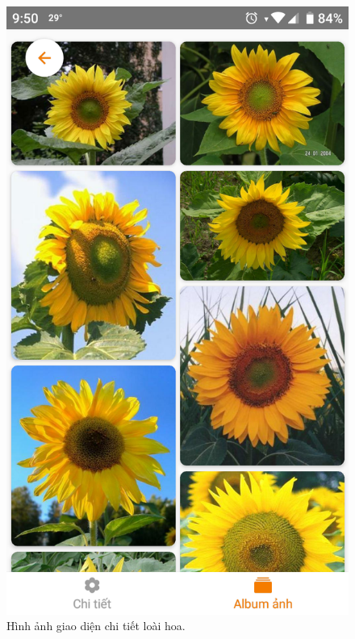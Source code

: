 \documentclass[12pt]{report}
\begin{document}
\begin{figure}[h]
			\includegraphics[scale=0.18]{app_detail2}
			\caption{Hình ảnh giao diện chi tiết loài hoa.}
			\label{fig:app_detail}
		\end{figure}
\end{document}
